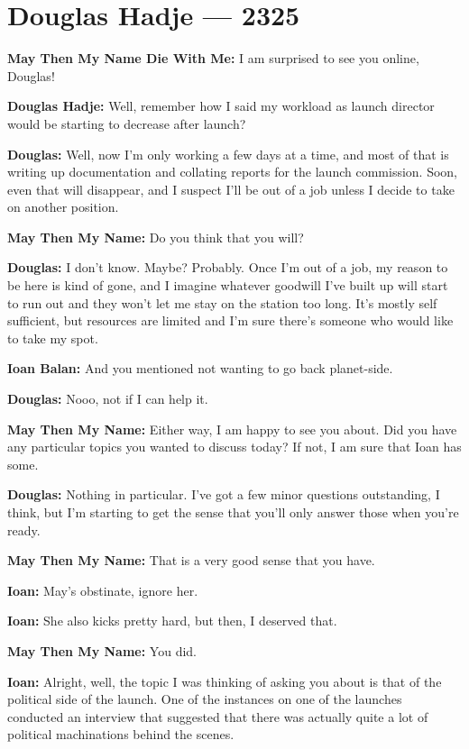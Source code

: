 \hypertarget{douglas-hadje-2325}{%
\chapter{Douglas Hadje — 2325}\label{douglas-hadje-2325}}

\textbf{May Then My Name Die With Me:} I am surprised to see you online, Douglas!

\textbf{Douglas Hadje:} Well, remember how I said my workload as launch director would be starting to decrease after launch?

\textbf{Douglas:} Well, now I'm only working a few days at a time, and most of that is writing up documentation and collating reports for the launch commission. Soon, even that will disappear, and I suspect I'll be out of a job unless I decide to take on another position.

\textbf{May Then My Name:} Do you think that you will?

\textbf{Douglas:} I don't know. Maybe? Probably. Once I'm out of a job, my reason to be here is kind of gone, and I imagine whatever goodwill I've built up will start to run out and they won't let me stay on the station too long. It's mostly self sufficient, but resources are limited and I'm sure there's someone who would like to take my spot.

\textbf{Ioan Balan:} And you mentioned not wanting to go back planet-side.

\textbf{Douglas:} Nooo, not if I can help it.

\textbf{May Then My Name:} Either way, I am happy to see you about. Did you have any particular topics you wanted to discuss today? If not, I am sure that Ioan has some.

\textbf{Douglas:} Nothing in particular. I've got a few minor questions outstanding, I think, but I'm starting to get the sense that you'll only answer those when you're ready.

\textbf{May Then My Name:} That is a very good sense that you have.

\textbf{Ioan:} May's obstinate, ignore her.

\textbf{Ioan:} She also kicks pretty hard, but then, I deserved that.

\textbf{May Then My Name:} You did.

\textbf{Ioan:} Alright, well, the topic I was thinking of asking you about is that of the political side of the launch. One of the instances on one of the launches conducted an interview that suggested that there was actually quite a lot of political machinations behind the scenes.

